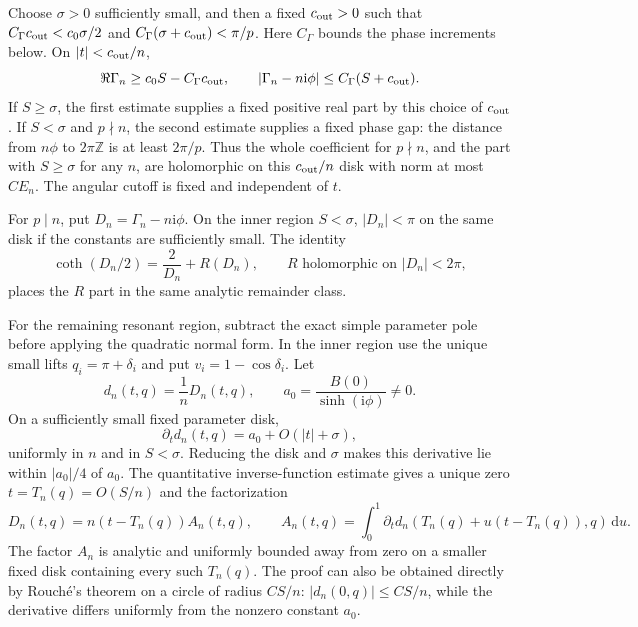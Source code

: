 \documentclass[11pt]{article}
\numberwithin{equation}{section}
\theoremstyle{definition}
\newcommand{\Z}{\mathbb Z}
\newcommand{\dd}{\,\mathrm d}
\newcommand{\ii}{\mathrm i}
\begin{document}
Choose $\sigma>0$ sufficiently small, and then a fixed
$c_{\rm out}>0$ such that
$C_\Gamma c_{\rm out}<c_0\sigma/2$ and
$C_\Gamma(\sigma+c_{\rm out})<\pi/p$.
Here $C_\Gamma$ bounds the phase increments below. On
$|t|<c_{\rm out}/n$,
\begin{equation}\label{eq:jets_c_over_n_estimate}
 \Re\Gamma_n\ge c_0S-C_\Gamma c_{\rm out},\qquad
 |\Gamma_n-n\ii\phi|\le C_\Gamma(S+c_{\rm out}).
\end{equation}
If $S\ge\sigma$, the first estimate supplies a fixed positive real
part by this choice of $c_{\rm out}$. If $S<\sigma$ and $p\nmid n$, the
second estimate supplies a fixed phase gap: the distance from
$n\phi$ to $2\pi\Z$ is at least $2\pi/p$. Thus the whole
coefficient for $p\nmid n$, and the part with $S\ge\sigma$ for any
$n$, are holomorphic on this $c_{\rm out}/n$ disk with norm at most $CE_n$.
The angular cutoff is fixed and independent of $t$.

For $p\mid n$, put $D_n=\Gamma_n-n\ii\phi$. On the inner region
$S<\sigma$, $|D_n|<\pi$ on the same disk if the constants are
sufficiently small. The identity
\begin{equation}\label{eq:jets_coth_subtraction}
 \coth(D_n/2)=\frac2{D_n}+R(D_n),
 \qquad R \text{ holomorphic on } |D_n|<2\pi,
\end{equation}
places the $R$ part in the same analytic remainder class.

For the remaining resonant region, subtract the exact simple parameter
pole before applying the quadratic normal form. In the inner region use the unique small
lifts $q_i=\pi+\delta_i$ and put $v_i=1-\cos\delta_i$. Let
\[
 d_n(t,q)=\frac1nD_n(t,q),\qquad
 a_0=\frac{B(0)}{\sinh(\ii\phi)}\ne0.
\]
On a sufficiently small fixed parameter disk,
\[
 \partial_t d_n(t,q)=a_0+O(|t|+\sigma),
\]
uniformly in $n$ and in $S<\sigma$. Reducing the disk and $\sigma$
makes this derivative lie within $|a_0|/4$ of $a_0$. The quantitative
inverse-function estimate gives a unique zero
$t=T_n(q)=O(S/n)$ and the factorization
\begin{equation}\label{eq:jets_exact_pole_factor}
 D_n(t,q)=n(t-T_n(q))A_n(t,q),\qquad
 A_n(t,q)=\int_0^1\partial_t d_n
       (T_n(q)+u(t-T_n(q)),q)\dd u.
\end{equation}
The factor $A_n$ is analytic and uniformly bounded away from zero on
a smaller fixed disk containing every such $T_n(q)$. The proof can
also be obtained directly by Rouch\'e's theorem on a circle of radius
$CS/n$: $|d_n(0,q)|\le CS/n$, while the derivative differs uniformly
from the nonzero constant $a_0$.
\end{document}
